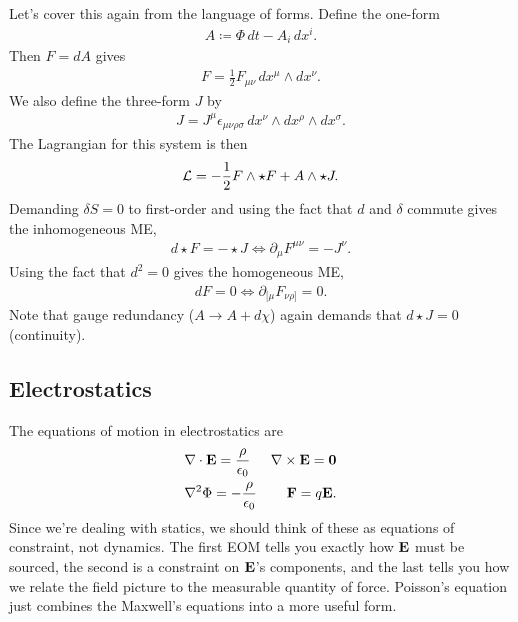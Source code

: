 \documentclass[11pt]{article}
\begin{document}
\begin{dderivation}
    \noin
    Let's cover this again from the language of forms.
    Define the one-form
    \begin{align*}
        A \coloneqq \Phi \, dt - A_i \, dx^i.
    \end{align*}
    Then $F = dA$ gives
    \begin{align*}
        F = \frac{1}{2} F_{\mu \nu} \, dx^\mu \wedge dx^\nu.
    \end{align*} 
    We also define the three-form $J$ by
    \begin{align*}
        J = J^\mu \epsilon_{\mu \nu \rho \sigma} \, dx^\nu \wedge dx^\rho \wedge dx^\sigma.
    \end{align*}
    The Lagrangian for this system is then
    \begin{align*}
        \mathcal{L} = - \frac{1}{2} F \wedge \star F + A \wedge \star J.
    \end{align*}
    Demanding $\delta S = 0$ to first-order and using the fact that
    $d$ and $\delta$ commute gives the inhomogeneous ME,
    \begin{align*}
        \boxed{d \star F = - \star J} \iff \partial_\mu F^{\mu \nu} = - J^\nu.
    \end{align*}
    Using the fact that $d^2 = 0$ gives the homogeneous ME,
    \begin{align*}
       \boxed{dF = 0} \iff \partial_{[\mu} F_{\nu \rho]} = 0.
    \end{align*}
    Note that gauge redundancy ($A \to A + d\chi$) again demands
    that $d \star J = 0$ (continuity).
\end{dderivation}


\subsection{Electrostatics}

The equations of motion in electrostatics are
\begin{align*}
    & \nabla \cdot \mathbf{E} = \frac{\rho}{\epsilon_0}
    & \nabla \times \mathbf{E} = \mathbf{0}\\
    & \nabla^2 \Phi = - \frac{\rho}{\epsilon_0}
    & \mathbf{F} = q \mathbf{E}.
\end{align*}
Since we're dealing with statics, we should think of these as equations of constraint,
not dynamics. The first EOM tells you exactly how $\mathbf{E}$ must be sourced,
the second is a constraint on $\mathbf{E}$'s components,
and the last tells you how we relate the field picture
to the measurable quantity of force. Poisson's equation 
just combines the Maxwell's equations into a more useful 
form.
\end{document}
